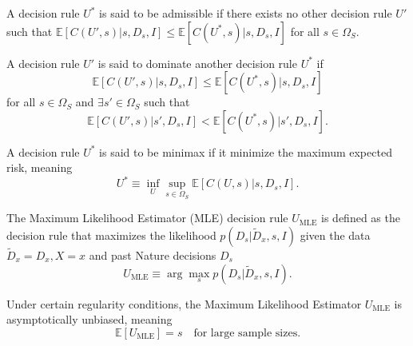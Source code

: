 \begin{definition}
	\label{def:admissible}
	A decision rule $U^*$ is said to be admissible if there exists no other decision rule $U'$ such that $\mathbb{E}[C(U', s) | s, D_s, I] \leq \mathbb{E}[C(U^*, s) | s, D_s, I]$ for all $s \in \Omega_S$.
\end{definition}

\begin{definition}
	\label{def:dominating}
	A decision rule $U'$ is said to dominate another decision rule $U^*$ if
	\begin{equation}
		\mathbb{E}[C(U', s) | s, D_s, I] \leq \mathbb{E}[C(U^*, s) | s, D_s, I]
	\end{equation}
	for all $s \in \Omega_S$ and $\exists s' \in \Omega_S$ such that
	\begin{equation}
		\mathbb{E}[C(U', s) | s', D_s, I] < \mathbb{E}[C(U^*, s) | s', D_s, I].
	\end{equation}
\end{definition}

\begin{definition}
	\label{def:minimax}
	A decision rule $U^*$ is said to be minimax if it minimize the maximum expected risk, meaning
	\begin{equation}
		U^* \equiv \inf_{U}\sup_{s\in \Omega_S}\mathbb{E}[C(U,s)|s,D_s,I].
	\end{equation}
\end{definition}





\begin{definition}
	\label{def:MLE}
	The Maximum Likelihood Estimator (MLE) decision rule $U_{\text{MLE}}$ is defined as the decision rule that maximizes the likelihood $p(D_s|\tilde{D}_x,s,I)$ given the data $\tilde{D}_x = D_x,X=x$ and past Nature decisions $D_s$
	\begin{equation}
		U_{\text{MLE}} \equiv \arg \max_{s} p(D_s|\tilde{D}_x,s,I).
	\end{equation}
\end{definition}






\begin{theorem}
	\label{thm:unbiased_mle}
	Under certain regularity conditions, the Maximum Likelihood Estimator $U_{\text{MLE}}$ is asymptotically unbiased, meaning
	\begin{equation}
		\mathbb{E}[U_{\text{MLE}}] = s \quad \text{for large sample sizes}.
	\end{equation}
\end{theorem}

